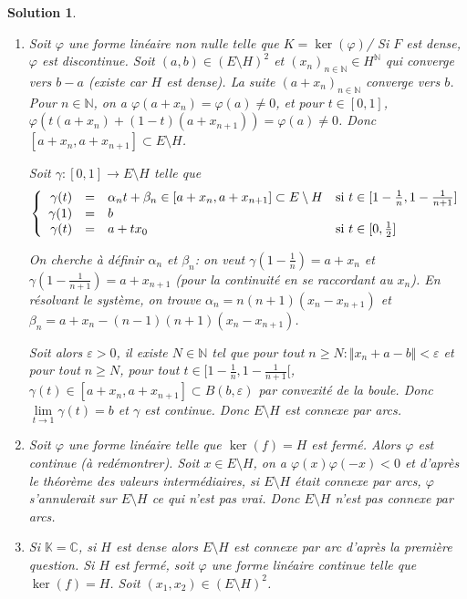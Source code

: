 \documentclass[12pt]{article}
\newtheorem{solution}{Solution}[section]
\theoremstyle{remark}
\newcommand{\K}{\mathbb{K}} \newcommand{\R}{\mathbb{R}}
\newcommand{\C}{\mathbb{C}} \newcommand{\Q}{\mathbb{Q}}
\newcommand{\N}{\mathbb{N}} \newcommand{\Z}{\mathbb{Z}}
\numberwithin{equation}{section}
\begin{document}
\begin{solution}
	\phantom{}
	\begin{enumerate}
		\item Soit $\varphi$ une forme linéaire non nulle telle que $K=\ker(\varphi)$/ Si $F$ est dense, $\varphi$ est discontinue. Soit $(a,b)\in(E\setminus H)^{2}$ et $(x_{n})_{n\in\N}\in H^{\N}$ qui converge vers $b-a$ (existe car $H$ est dense). La suite $(a+x_{n})_{n\in\N}$ converge vers $b$. Pour $n\in\N$, on a $\varphi(a+x_{n})=\varphi(a)\neq0$, et pour $t\in[0,1]$, $\varphi(t(a+x_{n})+(1-t)(a+x_{n+1}))=\varphi(a)\neq0$. Donc $[a+x_{n},a+x_{n+1}]\subset E\setminus H$.
		
		Soit $\gamma:[0,1]\to E\setminus H$ telle que 
		$$
		\left\{
			\begin{array}[]{rcll}
				\gamma(t) & = &\alpha_{n}t+\beta_{n}\in[a+x_{n},a+x_{n+1}]\subset E\setminus H &\text{si }t\in[1-\frac{1}{n},1-\frac{1}{n+1}]\\
				\gamma(1) & = &b&\\
				\gamma(t) &= & a+tx_{0}&\text{si }t\in[0,\frac{1}{2}]
			\end{array}
		\right.
		$$

		On cherche à définir $\alpha_{n}$ et $\beta_{n}$: on veut $\gamma(1-\frac{1}{n})=a+x_{n}$ et $\gamma(1-\frac{1}{n+1})=a+x_{n+1}$ (pour la continuité en se raccordant au $x_{n}$). En résolvant le système, on trouve $\alpha_{n}=n(n+1)(x_{n}-x_{n+1})$ et $\beta_{n}=a+x_{n}-(n-1)(n+1)(x_{n}-x_{n+1})$.

		Soit alors $\varepsilon>0$, il existe $N\in\N$ tel que pour tout $n\geqslant N\colon\Vert x_{n}+a-b\Vert<\varepsilon$ et pour tout $n\geqslant N$, pour tout $t\in[1-\frac{1}{n},1-\frac{1}{n+1}[$, $\gamma(t)\in[a+x_{n},a+x_{n+1}]\subset B(b,\varepsilon)$ par convexité de la boule. Donc $\lim\limits_{t\to 1}\gamma(t)=b$ et $\gamma$ est continue. Donc $E\setminus H$ est connexe par arcs.

		\item Soit $\varphi$ une forme linéaire telle que $\ker(f)=H$ est fermé. Alors $\varphi$ est continue (à redémontrer). Soit $x\in E\setminus H$, on a $\varphi(x)\varphi(-x)<0$ et d'après le théorème des valeurs intermédiaires, si $E\setminus H$ était connexe par arcs, $\varphi$ s'annulerait sur $E\setminus H$ ce qui n'est pas vrai. Donc $E\setminus H$ n'est pas connexe par arcs.
		
		\item Si $\K=\C$, si $H$ est dense alors $E\setminus H$ est connexe par arc d'après la première question. Si $H$ est fermé, soit $\varphi$ une forme linéaire continue telle que $\ker(f)=H$. Soit $(x_{1},x_{2})\in(E\setminus H)^{2}$. 
		

\end{enumerate}
\end{solution}
\end{document}
